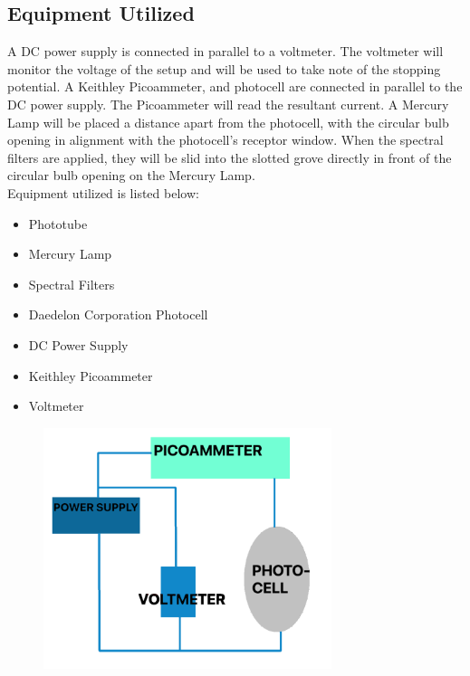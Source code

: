 \documentclass[a4paper]{article}
\begin{document}
\subsection{Equipment Utilized}

\qq A DC power supply is connected in parallel to a voltmeter. The
voltmeter will monitor the voltage of the setup and will be used to
take note of the stopping potential. A Keithley Picoammeter, and
photocell are connected in parallel to the DC power supply. The
Picoammeter will read the resultant current. A Mercury Lamp will be
placed a distance apart from the photocell, with the circular bulb
opening in alignment with the photocell's receptor window. When the
spectral filters are applied, they will be slid into the slotted grove
directly in front of the circular bulb opening on the Mercury Lamp. \\

Equipment utilized is listed below:

\begin{itemize}
\item Phototube 
\item Mercury Lamp 
\item Spectral Filters 
\item Daedelon Corporation Photocell 
\item DC Power Supply 
\item Keithley Picoammeter 
\item Voltmeter 
\end{itemize}

\begin{figure}[H]
\centering
\includegraphics[width=0.75\textwidth]{photo_circuit.png}
\label{photo_circuit}
\end{figure}
\end{document}

